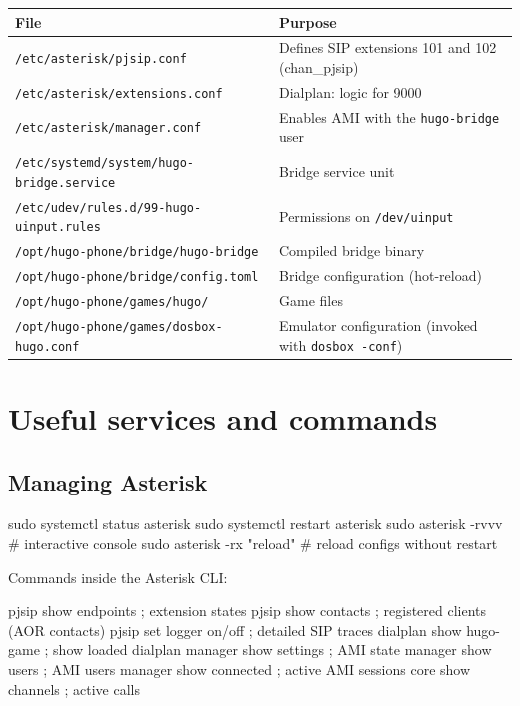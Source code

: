 \begin{table}[h]
\centering
\small
\begin{tabular}{p{} p{}}
\toprule
\textbf{File} & \textbf{Purpose} \\
\midrule
\texttt{/etc/asterisk/pjsip.conf} & Defines SIP extensions 101 and 102 (chan\_pjsip) \\
\texttt{/etc/asterisk/extensions.conf} & Dialplan: logic for 9000 \\
\texttt{/etc/asterisk/manager.conf} & Enables AMI with the \texttt{hugo-bridge} user \\
\texttt{/etc/systemd/system/hugo-bridge.service} & Bridge service unit \\
\texttt{/etc/udev/rules.d/99-hugo-uinput.rules} & Permissions on \texttt{/dev/uinput} \\
\texttt{/opt/hugo-phone/bridge/hugo-bridge} & Compiled bridge binary \\
\texttt{/opt/hugo-phone/bridge/config.toml} & Bridge configuration (hot-reload) \\
\texttt{/opt/hugo-phone/games/hugo/} & Game files \\
\texttt{/opt/hugo-phone/games/dosbox-hugo.conf} & Emulator configuration (invoked with \texttt{dosbox -conf}) \\
\bottomrule
\end{tabular}
\end{table}

\section{Useful services and commands}

\subsection{Managing Asterisk}

\begin{shellcode}
sudo systemctl status asterisk
sudo systemctl restart asterisk
sudo asterisk -rvvv               # interactive console
sudo asterisk -rx "reload"        # reload configs without restart
\end{shellcode}

Commands inside the Asterisk CLI:

\begin{plaincode}
pjsip show endpoints        ; extension states
pjsip show contacts         ; registered clients (AOR contacts)
pjsip set logger on/off     ; detailed SIP traces
dialplan show hugo-game     ; show loaded dialplan
manager show settings       ; AMI state
manager show users          ; AMI users
manager show connected      ; active AMI sessions
core show channels          ; active calls
\end{plaincode}

